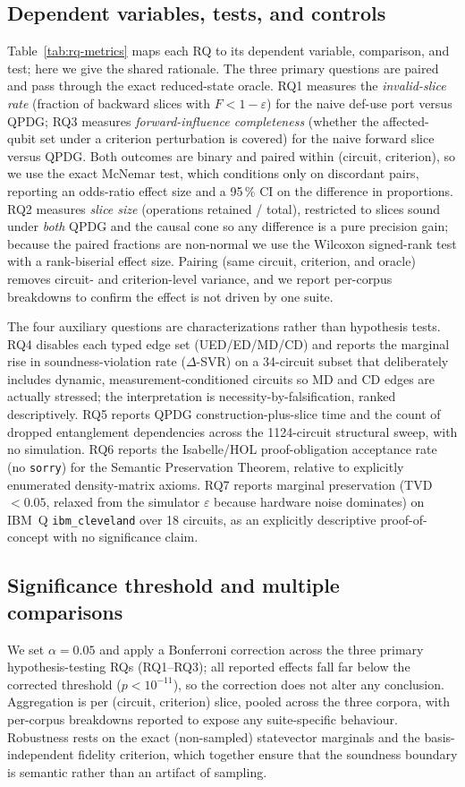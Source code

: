 \documentclass[10pt,conference]{IEEEtran}
\theoremstyle{definition}
\begin{document}
\subsection{Dependent variables, tests, and controls}
Table~\ref{tab:rq-metrics} maps each RQ to its dependent variable, comparison, and test; here we give the shared rationale. The three primary questions are paired and pass through the exact reduced-state oracle. RQ1 measures the \emph{invalid-slice rate} (fraction of backward slices with $F<1-\varepsilon$) for the naive def-use port versus QPDG; RQ3 measures \emph{forward-influence completeness} (whether the affected-qubit set under a criterion perturbation is covered) for the naive forward slice versus QPDG. Both outcomes are binary and paired within (circuit, criterion), so we use the exact McNemar test, which conditions only on discordant pairs, reporting an odds-ratio effect size and a 95\,\% CI on the difference in proportions. RQ2 measures \emph{slice size} (operations retained / total), restricted to slices sound under \emph{both} QPDG and the causal cone so any difference is a pure precision gain; because the paired fractions are non-normal we use the Wilcoxon signed-rank test with a rank-biserial effect size. Pairing (same circuit, criterion, and oracle) removes circuit- and criterion-level variance, and we report per-corpus breakdowns to confirm the effect is not driven by one suite.

The four auxiliary questions are characterizations rather than hypothesis tests. RQ4 disables each typed edge set (UED/ED/MD/CD) and reports the marginal rise in soundness-violation rate ($\Delta$-SVR) on a 34-circuit subset that deliberately includes dynamic, measurement-conditioned circuits so MD and CD edges are actually stressed; the interpretation is necessity-by-falsification, ranked descriptively. RQ5 reports QPDG construction-plus-slice time and the count of dropped entanglement dependencies across the 1124-circuit structural sweep, with no simulation. RQ6 reports the Isabelle/HOL proof-obligation acceptance rate (no \texttt{sorry}) for the Semantic Preservation Theorem, relative to explicitly enumerated density-matrix axioms. RQ7 reports marginal preservation (TVD $<0.05$, relaxed from the simulator $\varepsilon$ because hardware noise dominates) on IBM~Q \texttt{ibm\_cleveland} over 18 circuits, as an explicitly descriptive proof-of-concept with no significance claim.

\subsection{Significance threshold and multiple comparisons}
We set $\alpha=0.05$ and apply a Bonferroni correction across the three primary hypothesis-testing RQs (RQ1--RQ3); all reported effects fall far below the corrected threshold ($p<10^{-11}$), so the correction does not alter any conclusion. Aggregation is per (circuit, criterion) slice, pooled across the three corpora, with per-corpus breakdowns reported to expose any suite-specific behaviour. Robustness rests on the exact (non-sampled) statevector marginals and the basis-independent fidelity criterion, which together ensure that the soundness boundary is semantic rather than an artifact of sampling.
\end{document}
